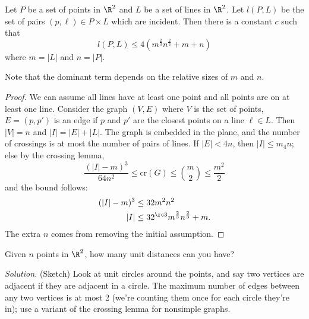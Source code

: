 \begin{thm}
Let $P$ be a set of points in $\R^2$ and $L$ be a set of lines in $\R^2$. Let $l(P,L)$ be the set of pairs $(p,\ell)\in P\times L$ which are incident. Then there is a constant $c$ such that 
\[
l(P,L)\le 4(m^{\frac 23} n^{\frac 23} +m+n)
\]
where $m=|L|$ and $n=|P|$.
\end{thm}
Note that the dominant term depends on the relative sizes of $m$ and $n$.
\begin{proof}
We can assume all lines have at least one point and all points are on at least one line. Consider the graph $(V,E)$ where $V$ is the set of points, $E=(p,p')$ is an edge if $p$ and $p'$ are the closest points on a line $\ell\in L$. Then $|V|=n$ and $|I|=|E|+|L|$. 
The graph is embedded in the plane, and the number of crossings is at most the number of pairs of lines. If $|E|<4n$, then $|I|\le m_4n$; else
by the crossing lemma, 
\[
\frac{(|I|-m)^3}{64n^2}\le \text{cr}(G)\le \binom m2\le \frac{m^2}{2}
\]
and the bound follows:
\begin{align*}
(|I|-m)^3&\le 32 m^2 n^2\\
|I|&\le 32^{\rc 3} m^{\frac 23} n^{\frac 23} +m. 
\end{align*}
The extra $n$ comes from removing the initial assumption.
\end{proof}
\begin{ex}
Given $n$ points in $\R^2$, how many unit distances can you have?
\end{ex}
{\it Solution.} (Sketch) Look at unit circles around the points, and say two vertices are adjacent if they are adjacent in a circle. The maximum number of edges between any two vertices is at most 2 (we're counting them once for each circle they're in); use a variant of the crossing lemma for nonsimple graphs.

